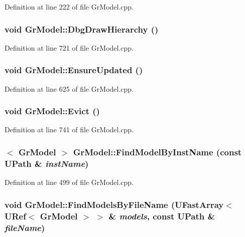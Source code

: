 Definition at line 222 of file GrModel.cpp.\hypertarget{class_gr_model_a125d73b384a3353dfbac65a93588282}{
\subsubsection[{DbgDrawHierarchy}]{\setlength{\rightskip}{0pt plus 5cm}void GrModel::DbgDrawHierarchy ()}}
\label{class_gr_model_a125d73b384a3353dfbac65a93588282}




Definition at line 721 of file GrModel.cpp.\hypertarget{class_gr_model_12002759a1e3c55bf2ec71d21f197a0d}{
\subsubsection[{EnsureUpdated}]{\setlength{\rightskip}{0pt plus 5cm}void GrModel::EnsureUpdated ()}}
\label{class_gr_model_12002759a1e3c55bf2ec71d21f197a0d}




Definition at line 625 of file GrModel.cpp.\hypertarget{class_gr_model_2b4b150bcaf7982b1e70cb80549bc704}{
\subsubsection[{Evict}]{\setlength{\rightskip}{0pt plus 5cm}void GrModel::Evict ()}}
\label{class_gr_model_2b4b150bcaf7982b1e70cb80549bc704}




Definition at line 741 of file GrModel.cpp.\hypertarget{class_gr_model_edeff0285708b660e0c21e2cb65da360}{
\subsubsection[{FindModelByInstName}]{$<$ {\bf GrModel} $>$ GrModel::FindModelByInstName (const {\bf UPath} \& {\em instName})}}
\label{class_gr_model_edeff0285708b660e0c21e2cb65da360}




Definition at line 499 of file GrModel.cpp.\hypertarget{class_gr_model_51f1bc0e7546b45969e3d40f600f7690}{
\subsubsection[{FindModelsByFileName}]{\setlength{\rightskip}{0pt plus 5cm}void GrModel::FindModelsByFileName ({\bf UFastArray}$<$ {\bf URef}$<$ {\bf GrModel} $>$ $>$ \& {\em models}, \/  const {\bf UPath} \& {\em fileName})}}
\label{class_gr_model_51f1bc0e7546b45969e3d40f600f7690}




